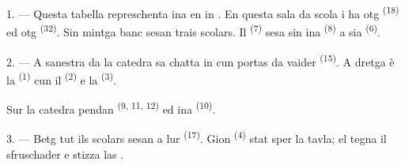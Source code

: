 %
%
%

\VUsaut{2.0mm}
\VUsaut{3.2mm}
\VUsaut{2.6mm}
\VUsaut{3.4mm}
\VUornamento{9pt}
\VUsaut{5.0mm}
\VUsaut{3.0mm}
\VUfilet{16mm}
\VUsaut{5.6mm}

\VUsaut{1.4mm}
\VUsaut{2.2mm}
\VUfilet{20mm}
\VUsaut{6.4mm}

\VUsaut{3.0mm}

1. --- Questa tabella represchenta ina  en in
. En questa sala da scola i ha otg 
\textsuperscript{(18)} ed otg  \textsuperscript{(32)}. Sin mintga
banc sesan trais scolars. Il  \textsuperscript{(7)} sesa sin ina
 \textsuperscript{(8)} a sia  \textsuperscript{(6)}.

2. --- A sanestra da la catedra sa chatta in  cun portas da vaider
\textsuperscript{(15)}. A dretga è la  \textsuperscript{(1)} cun
il  \textsuperscript{(2)} e la 
\textsuperscript{(3)}.

Sur la catedra pendan  \textsuperscript{(9, 11, 12)} ed ina
 \textsuperscript{(10)}.

3. --- Betg tut ils scolars sesan a lur  \textsuperscript{(17)}. Gion
\textsuperscript{(4)} stat sper la tavla; el tegna il sfruschader e stizza las
.

